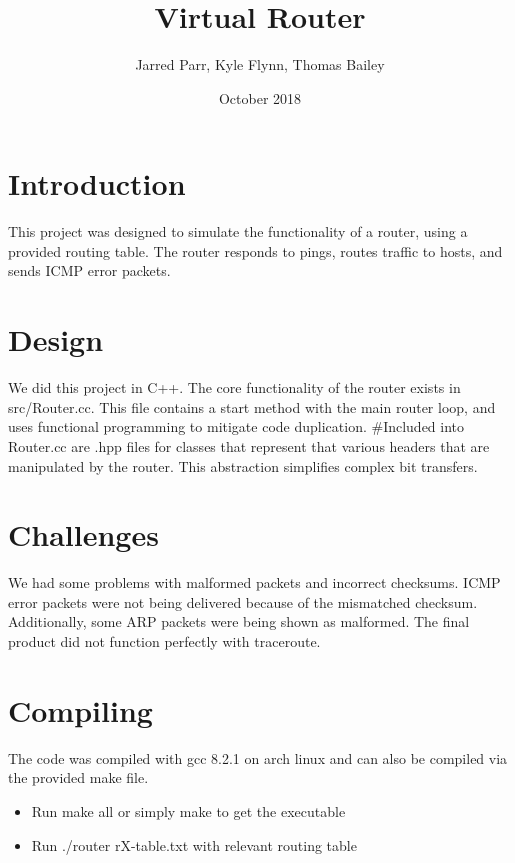 \documentclass[11pt]{article}
\begin{document}
\title{Virtual Router}
\author{Jarred Parr, Kyle Flynn, Thomas Bailey}

\date{October 2018}
\maketitle
\section{Introduction}
This project was designed to simulate the functionality of a router, using a provided routing table. The router responds to pings, routes traffic to hosts, and sends ICMP error packets.

\section{Design}
We did this project in C++. The core functionality of the router exists in src/Router.cc. This file contains a start method with the main router loop, and uses functional programming to mitigate code duplication. #Included into Router.cc are .hpp files for classes that represent that various headers that are manipulated by the router. This abstraction simplifies complex bit transfers.

\section{Challenges}

We had some problems with malformed packets and incorrect checksums. ICMP error packets were not being delivered because of the mismatched checksum. Additionally, some ARP packets were being shown as malformed. The final product did not function perfectly with traceroute.

\section{Compiling}
The code was compiled with gcc 8.2.1 on arch linux and can also be compiled via the provided make file. 

\begin{itemize}
  \item Run make all or simply make to get the executable
  \item Run ./router rX-table.txt with relevant routing table
\end{itemize}
\end{document}

